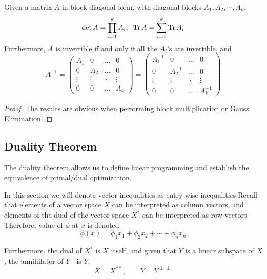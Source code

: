   \begin{theorem}
    Given a matrix $A$ in block diagonal form, with diagonal blocks $A_1, A_2, \cdots, A_k$,
    \begin{equation}
      \det{A} = \prod_{i=1}^k A_i, \; \; \operatorname{Tr}{A} = \sum_{i=1}^k \operatorname{Tr}{A_i}
    \end{equation}
    Furthermore, $A$ is invertible if and only if all the $A_i$'s are invertible, and 
    \begin{equation}
      A^{-1} = \begin{pmatrix}
      A_1&0&\ldots&0\\
      0&A_2&\ldots&0\\
      \vdots&\vdots&\ddots&\vdots\\
      0&0&\ldots&A_k
      \end{pmatrix} = \begin{pmatrix}
      A_1^{-1}&0&\ldots&0\\
      0&A_2^{-1}&\ldots&0\\
      \vdots&\vdots&\ddots&\vdots\\
      0&0&\ldots&A_k^{-1}
      \end{pmatrix}
    \end{equation}
  \end{theorem}
  \begin{proof}
    The results are obvious when performing block multiplication or Gauss Elimination. 
  \end{proof}

\subsection{Duality Theorem}

  The duality theorem allows us to define linear programming and establish the equivalence of primal/dual optimization. 

  In this section we will denote vector inequalities as entry-wise inequalities.Recall that elements of a vector space $X$ can be interpreted as column vectors, and elements of the dual of the vector space $X^\ast$ can be interpreted as row vectors. Therefore, value of $\phi$ at $x$ is denoted
  \begin{equation}
    \phi (x) = \phi_1 x_1 + \phi_2 x_2 + \cdots + \phi_n x_n
  \end{equation}

  Furthermore, the dual of $X^\ast$ is $X$ itself, and given that $Y$ is a linear subspace of $X$, the annihilator of $Y^\perp$ is $Y$. 
  \begin{equation}
    X = X^{**}, \qquad Y = Y^{\perp\perp}
  \end{equation}

